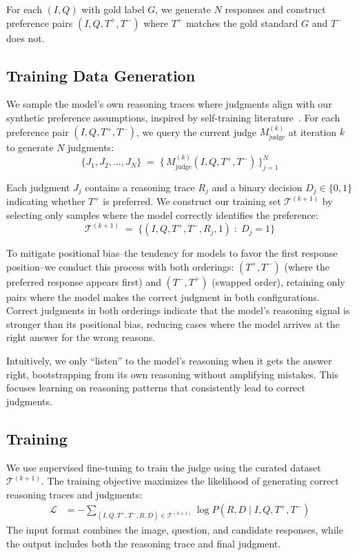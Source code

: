 For each $(I, Q)$ with gold label $G$, we generate $N$ responses and construct preference pairs $(I, Q, T^+, T^-)$ where $T^+$ matches the gold standard $G$ and $T^-$ does not.

\subsection{Training Data Generation}
\label{sec:2.2}
We sample the model's own reasoning traces where judgments align with our synthetic preference assumptions, inspired by self-training literature~\cite{wang2024selftaughtevaluators, hu2024visual}. For each preference pair $(I, Q, T^+, T^-)$, we query the current judge $M_{\text{judge}}^{(k)}$ at iteration $k$ to generate $N$ judgments:
\[
\{J_1, J_2, \ldots, J_N\} \;=\; \{\,M_{\text{judge}}^{(k)}(I, Q, T^+, T^-)\,\}_{j=1}^N
\]

Each judgment $J_j$ contains a reasoning trace $R_j$ and a binary decision $D_j \in \{0, 1\}$ indicating whether $T^+$ is preferred. We construct our training set $\mathcal{T}^{(k+1)}$ by selecting only samples where the model correctly identifies the preference:
\[
\mathcal{T}^{(k+1)} \;=\; \{(I, Q, T^+, T^-, R_j, 1) \;:\; D_j = 1\}
\]

To mitigate positional bias--the tendency for models to favor the first response position--we conduct this process with both orderings: $(T^+, T^-)$ (where the preferred response appears first) and $(T^-, T^+)$ (swapped order), retaining only pairs where the model makes the correct judgment in both configurations.  Correct judgments in both orderings indicate that the model's reasoning signal is stronger than its positional bias, reducing cases where the model arrives at the right answer for the wrong reasons. 

Intuitively, we only ``listen'' to the model's reasoning when it gets the answer right, bootstrapping from its own reasoning without amplifying mistakes. This focuses learning on reasoning patterns that consistently lead to correct judgments. 

\subsection{Training}
\label{sec:2.3}
We use supervised fine-tuning to train the judge using the curated dataset $\mathcal{T}^{(k+1)}$. The training objective maximizes the likelihood of generating correct reasoning traces and judgments:
\begin{align*}
\mathcal{L} 
  &= - \sum_{(I, Q, T^+, T^-, R, D) \in \mathcal{T}^{(k+1)}} 
       \log P(R, D \mid  I, Q, T^+, T^-)
\end{align*}
The input format combines the image, question, and candidate responses, while the output includes both the reasoning trace and final judgment.
